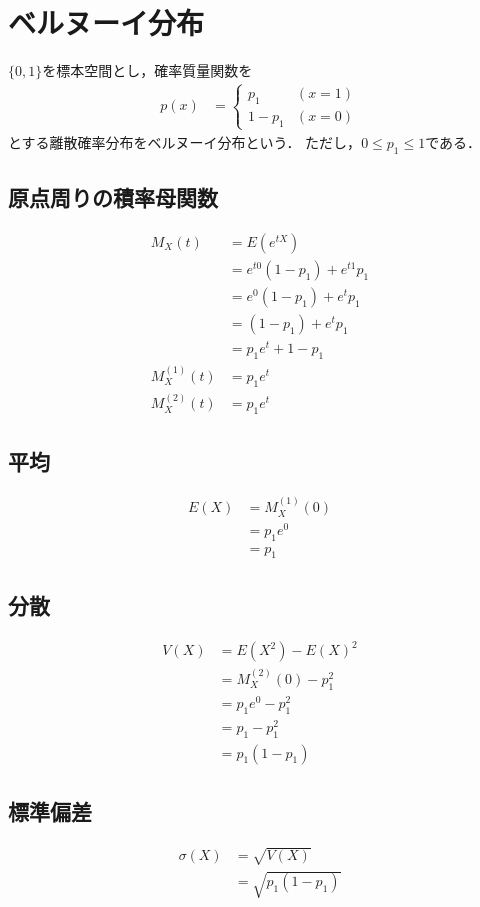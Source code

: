 \documentclass[dvipdfmx]{jsarticle}
\begin{document}
 \section{ベルヌーイ分布}
$\{0,1\}$を標本空間とし，確率質量関数を
 \begin{align}
  p\left(x\right)&=
  \begin{cases}
   p_1&\left(x=1\right)\\
   1-p_1&\left(x=0\right)
  \end{cases}
 \end{align}
とする離散確率分布をベルヌーイ分布という．
ただし，$0\le p_1\le 1$である．
 \subsection{原点周りの積率母関数}
 \begin{align}
  M_X\left(t\right)&=E\left(e^{tX}\right)\nonumber\\
  &=e^{t0}\left(1-p_1\right)+e^{t1}p_1\nonumber\\
  &=e^0\left(1-p_1\right)+e^tp_1\nonumber\\
  &=\left(1-p_1\right)+e^tp_1\nonumber\\
  &=p_1e^t+1-p_1\\
  M_X^{\left(1\right)}\left(t\right)&=p_1e^t\\
  M_X^{\left(2\right)}\left(t\right)&=p_1e^t
 \end{align}
 \subsection{平均}
 \begin{align}
  E\left(X\right)&=M_X^{\left(1\right)}\left(0\right)\nonumber\\
  &=p_1e^0\nonumber\\
  &=p_1
 \end{align}
 \subsection{分散}
 \begin{align}
  V\left(X\right)&=E\left(X^2\right)-E\left(X\right)^2\nonumber\\
  &=M_X^{\left(2\right)}\left(0\right)-p_1^2\nonumber\\
  &=p_1e^0-p_1^2\nonumber\\
  &=p_1-p_1^2\nonumber\\
  &=p_1\left(1-p_1\right)
 \end{align}
 \subsection{標準偏差}
 \begin{align}
  \sigma\left(X\right)&=\sqrt{V\left(X\right)}\nonumber\\
  &=\sqrt{p_1\left(1-p_1\right)}
 \end{align}
\end{document}

